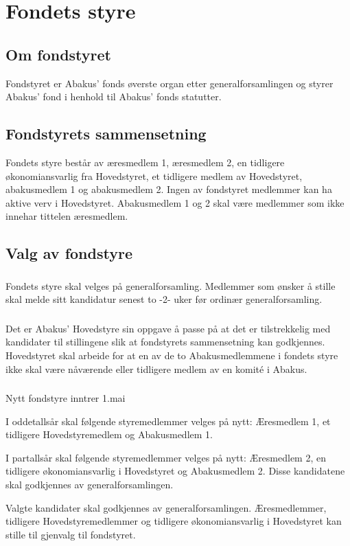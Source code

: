 \section{Fondets styre}
\subsection{Om fondstyret}
Fondstyret er Abakus’ fonds øverste organ etter generalforsamlingen og styrer
Abakus’ fond i henhold til Abakus’ fonds statutter.

\subsection{Fondstyrets sammensetning}
Fondets styre består av æresmedlem 1, æresmedlem 2, en tidligere økonomiansvarlig fra 
Hovedstyret, et tidligere medlem av Hovedstyret, abakusmedlem 1 og abakusmedlem 2.
Ingen av fondstyret medlemmer kan ha aktive verv i Hovedstyret. Abakusmedlem 1 og 2 skal 
være medlemmer som ikke innehar tittelen æresmedlem. 

\subsection{Valg av fondstyre}
\subsubsection{}
Fondets styre skal velges på generalforsamling. Medlemmer som ønsker å stille skal melde 
sitt kandidatur senest to -2- uker før ordinær generalforsamling. 

\subsubsection{}
Det er Abakus’ Hovedstyre sin oppgave å passe på at det er tilstrekkelig med kandidater til 
stillingene slik at fondstyrets sammensetning kan godkjennes. Hovedstyret skal arbeide for 
at en av de to Abakusmedlemmene i fondets styre ikke skal være nåværende eller tidligere 
medlem av en komité i Abakus.

\subsubsection{}
Nytt fondstyre inntrer 1.mai

I oddetallsår skal følgende styremedlemmer velges på nytt: Æresmedlem 1, et tidligere 
Hovedstyremedlem og Abakusmedlem 1. 

I partallsår skal følgende styremedlemmer velges på nytt: Æresmedlem 2, en tidligere 
økonomiansvarlig i Hovedstyret og Abakusmedlem 2. 
Disse kandidatene skal godkjennes av generalforsamlingen. 

Valgte kandidater​ skal godkjennes av generalforsamlingen. Æresmedlemmer,
tidligere Hovedstyremedlemmer og tidligere økonomiansvarlig i Hovedstyret​ kan
stille til gjenvalg til fondstyret.
